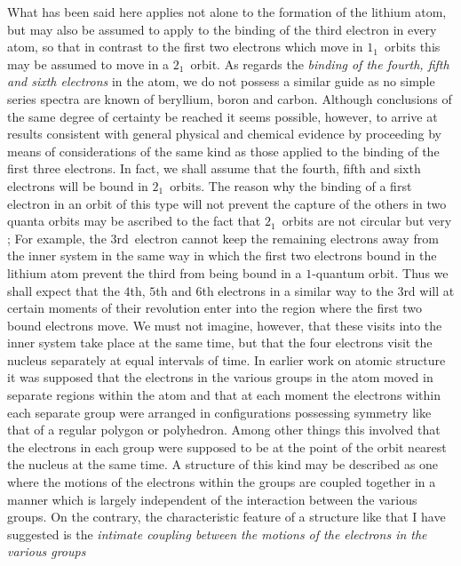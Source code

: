 What has been said here applies not alone to the formation of
the lithium atom, but may also be assumed to apply to the binding
of the third electron in every atom, so that in contrast to the first
two electrons which move in $1_{1}$~orbits this may be assumed to move
in a $2_{1}$~orbit. As regards the \emph{binding of the fourth, fifth and sixth
electrons} in the atom, we do not possess a similar guide as no simple
series spectra are known of beryllium, boron and carbon. Although
conclusions of the same degree of certainty  be reached it
seems possible, however, to arrive at results consistent with general
physical and chemical evidence by proceeding by means of considerations
of the same kind as those applied to the binding of the
first three electrons. In fact, we shall assume that the fourth, fifth
and sixth electrons will be bound in $2_{1}$~orbits. The reason why the
binding of a first electron in an orbit of this type will not prevent the
capture of the others in two quanta orbits may be ascribed to the fact
that $2_{1}$~orbits are not circular but very ; For example, the
$3$rd~electron cannot keep the remaining electrons away from the inner
system in the same way in which the first two electrons bound in
the lithium atom prevent the third from being bound in a
$1$-quantum orbit. Thus we shall expect that the $4$th, $5$th and $6$th
electrons in a similar way to the $3$rd will at certain moments of
their revolution enter into the region where the first two
bound electrons move. We must not imagine, however, that these
visits into the inner system take place at the same time, but
that the four electrons visit the nucleus separately at equal
intervals of time. In earlier work on atomic structure it was supposed
that the electrons in the various groups in the atom moved
in separate regions within the atom and that at each moment the
electrons within each separate group were arranged in configurations
possessing symmetry like that of a regular polygon or polyhedron.
Among other things this involved that the electrons in each group
were supposed to be at the point of the orbit nearest the nucleus
at the same time. A structure of this kind may be described as one
where the motions of the electrons within the groups are coupled
together in a manner which is largely independent of the interaction
between the various groups. On the contrary, the characteristic
feature of a structure like that I have suggested is the \emph{intimate
coupling between the motions of the electrons in the various groups}
